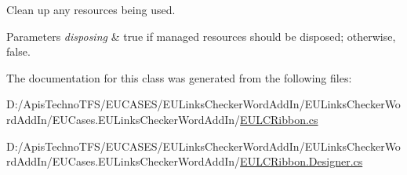 Clean up any resources being used. 


\begin{DoxyParams}{Parameters}
{\em disposing} & true if managed resources should be disposed; otherwise, false.\\
\hline
\end{DoxyParams}


The documentation for this class was generated from the following files\+:\begin{DoxyCompactItemize}
\item 
D\+:/\+Apis\+Techno\+T\+F\+S/\+E\+U\+C\+A\+S\+E\+S/\+E\+U\+Links\+Checker\+Word\+Add\+In/\+E\+U\+Links\+Checker\+Word\+Add\+In/\+E\+U\+Cases.\+E\+U\+Links\+Checker\+Word\+Add\+In/\hyperlink{_e_u_l_c_ribbon_8cs}{E\+U\+L\+C\+Ribbon.\+cs}\item 
D\+:/\+Apis\+Techno\+T\+F\+S/\+E\+U\+C\+A\+S\+E\+S/\+E\+U\+Links\+Checker\+Word\+Add\+In/\+E\+U\+Links\+Checker\+Word\+Add\+In/\+E\+U\+Cases.\+E\+U\+Links\+Checker\+Word\+Add\+In/\hyperlink{_e_u_l_c_ribbon_8_designer_8cs}{E\+U\+L\+C\+Ribbon.\+Designer.\+cs}\end{DoxyCompactItemize}
